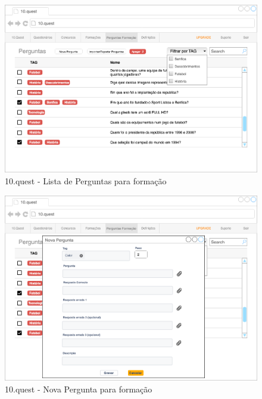 \begin{figure}[ht!]
	\begin{center}
		\includegraphics[width=1\textwidth]{img/prototipos/6.png}
		\caption{10.quest - Lista de Perguntas para formação}
		\label{10q-}
	\end{center}
\end{figure}

\begin{figure}[ht!]
	\begin{center}
		\includegraphics[width=1\textwidth]{img/prototipos/7.png}
		\caption{10.quest - Nova Pergunta para formação}
		\label{10q-}
	\end{center}
\end{figure}


